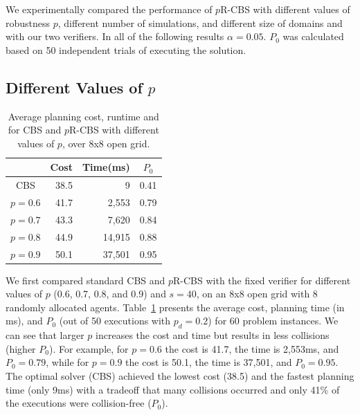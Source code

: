 \documentclass{article}
\newcommand{\prcbs}{$p$R-CBS\xspace}
\begin{document}
We experimentally compared the performance of \prcbs{} with different values of robustness $p$, different number of simulations, and different size of domains and with our two verifiers.
In all of the following results $\alpha=0.05$. $P_0$ was calculated based on 50 independent trials of executing the solution. 


\subsection{Different Values of \texorpdfstring{$p$}.}

\begin{table}[t]
\centering
\begin{tabular}{|c|r|r|r|}
\hline
\multicolumn{1}{|l|}{} & \multicolumn{1}{c|}{Cost} & \multicolumn{1}{c|}{Time(ms)} & \multicolumn{1}{c|}{$P_0$} \\ \hline
CBS                    & 38.5                      & 9                         & 0.41                       \\
$p=0.6$                  & 41.7                      & 2,553                     & 0.79                       \\
$p=0.7$                  & 43.3                      & 7,620                     & 0.84                       \\
$p=0.8$                  & 44.9                      & 14,915                    & 0.88                       \\
$p=0.9$                  & 50.1                      & 37,501                    & 0.95                       \\ \hline
\end{tabular}
\caption{Average planning cost, runtime and for CBS and \prcbs{} with different values of $p$,  over 8x8 open grid.}
\label{tab:p-values}
\end{table}

We first compared  standard CBS and \prcbs{} with the fixed verifier for different values of $p$ (0.6, 0.7, 0.8, and 0.9) and $s=40$, on an 8x8 open grid with 8 randomly allocated agents. Table~\ref{tab:p-values} presents the average cost, planning time (in ms), and $P_0$ (out of 50 executions with $p_d=0.2$)  for 60 problem instances.
We can see that larger $p$ increases the cost and time but results in less collisions (higher $P_0$). For example, for $p=0.6$ the cost is 41.7, the time is 2,553ms, and $P_0=0.79$, while for $p=0.9$ the cost is 50.1, the time is 37,501, and $P_0=0.95$. The optimal solver (CBS) achieved the lowest cost (38.5) and the fastest planning time (only 9ms) with a tradeoff that many collisions occurred and only 41\% of the executions were collision-free ($P_0$).
\end{document}
